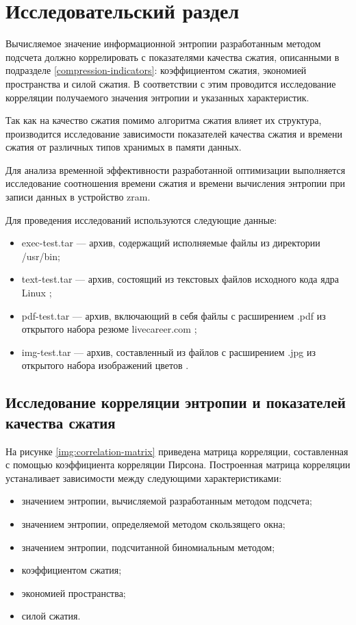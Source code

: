 \chapter{Исследовательский раздел}\label{research}

Вычисляемое значение информационной энтропии разработанным методом подсчета должно коррелировать с показателями качества сжатия, описанными в подразделе \ref{compression-indicators}: коэффициентом сжатия, экономией пространства и силой сжатия. В соответствии с этим проводится исследование корреляции получаемого значения энтропии и указанных характеристик.

Так как на качество сжатия помимо алгоритма сжатия влияет их структура, производится исследование зависимости показателей качества сжатия и времени сжатия от различных типов хранимых в памяти данных.

Для анализа временной эффективности разработанной оптимизации выполняется исследование соотношения времени сжатия и времени вычисления энтропии при записи данных в устройство zram.

Для проведения исследований используются следующие данные:

\begin{itemize}
    \item exec-test.tar --- архив, содержащий исполняемые файлы из директории /usr/bin;
    \item text-test.tar --- архив, состоящий из текстовых файлов исходного кода ядра Linux \cite{linux-code};
    \item pdf-test.tar --- архив, включающий в себя файлы с расширением .pdf из открытого набора резюме livecareer.com \cite{resume-dataset};
    \item img-test.tar --- архив, составленный из файлов с расширением .jpg из открытого набора изображений цветов \cite{flowers-dataset}.
\end{itemize}

\section{Исследование корреляции энтропии и показателей качества сжатия}

На рисунке \ref{img:correlation-matrix} приведена матрица корреляции, составленная с помощью коэффициента корреляции Пирсона. Построенная матрица корреляции устаналивает зависимости между следующими характеристиками:

\begin{itemize}
    \item значением энтропии, вычисляемой разработанным методом подсчета;
    \item значением энтропии, определяемой методом скользящего окна;
    \item значением энтропии, подсчитанной биномиальным методом;
    \item коэффициентом сжатия;
    \item экономией пространства;
    \item силой сжатия.
\end{itemize}

